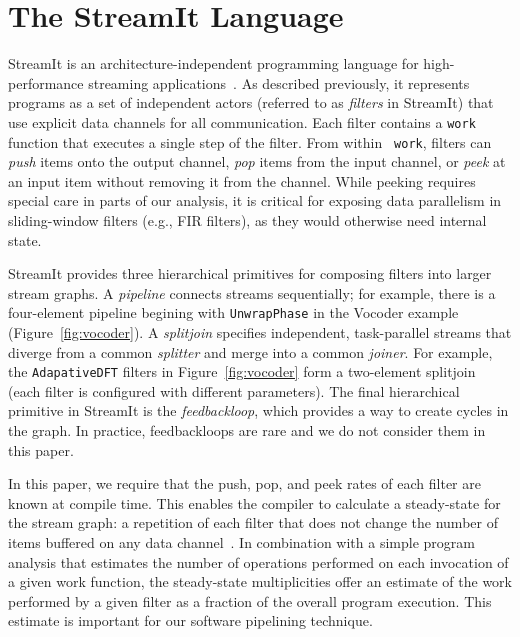 \section{The StreamIt Language}

StreamIt is an architecture-independent programming language for
high-performance streaming
applications~\cite{streamitcc,streamit-lang-spec}.  As described
previously, it represents programs as a set of independent actors
(referred to as {\it filters} in StreamIt) that use explicit data
channels for all communication.  Each filter contains a {\tt work}
function that executes a single step of the filter.  From within {\tt
work}, filters can {\it push} items onto the output channel, {\it pop}
items from the input channel, or {\it peek} at an input item without
removing it from the channel.  
While peeking requires special care in parts of our analysis, it is
critical for exposing data parallelism in sliding-window filters
(e.g., FIR filters), as they would otherwise need internal state.

StreamIt provides three hierarchical primitives for composing filters
into larger stream graphs.  A {\it pipeline} connects streams
sequentially; for example, there is a four-element pipeline begining
with {\tt UnwrapPhase} in the Vocoder example
(Figure~\ref{fig:vocoder}).  A {\it splitjoin} specifies independent,
task-parallel streams that diverge from a common {\it splitter} and
merge into a common {\it joiner}.  For example, the {\tt AdapativeDFT}
filters in Figure~\ref{fig:vocoder} form a two-element splitjoin (each
filter is configured with different parameters).  The final
hierarchical primitive in StreamIt is the {\it feedbackloop}, which
provides a way to create cycles in the graph.  In practice,
feedbackloops are rare and we do not consider them in this paper.

In this paper, we require that the push, pop, and peek rates of each
filter are known at compile time.  This enables the compiler to
calculate a steady-state for the stream graph: a repetition of each
filter that does not change the number of items buffered on any data
channel~\cite{lee87,karczmarek:lctes:2003}. In
combination with a simple program analysis that estimates the number
of operations performed on each invocation of a given work function,
the steady-state multiplicities offer an estimate of the work
performed by a given filter as a fraction of the overall program
execution.  This estimate is important for our software pipelining
technique.
